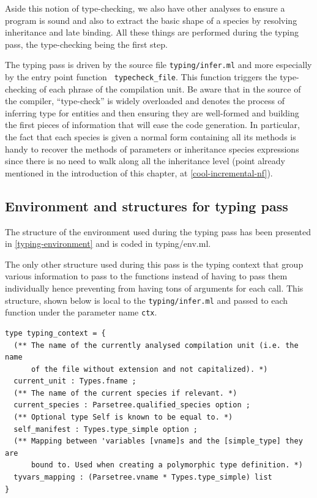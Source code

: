 \medskip
Aside this notion of type-checking, we also have other analyses to
ensure a program is sound and also to extract the basic shape of a
species by resolving inheritance and late binding. All these things
are performed during the typing pass, the type-checking being the
first step.

\medskip
The typing pass is driven by the source file {\tt typing/infer.ml} and
more especially by the entry point function {\tt
  typecheck\_file}. This function triggers the type-checking of each
phrase of the compilation unit. Be aware that in the source of the
compiler, ``type-check'' is widely overloaded and denotes the process
of inferring type for entities and then ensuring they are well-formed
and building the first pieces of information that will ease the code
generation. In particular, the fact that each species is given a
normal form containing all its methods is handy to recover the methods
of parameters or inheritance species expressions since there is no
need to walk along all the inheritance level (point already mentioned
in the introduction of this chapter, at \ref{cool-incremental-nf}).



\subsection{Environment and structures for typing pass}
The structure of the environment used during the typing pass has been
presented in \ref{typing-environment} and is coded in {typing/env.ml}.

The only other structure used during this pass is the typing context
that group various information to pass to the functions instead of
having to pass them individually hence preventing from having tons of
arguments for each call. This structure, shown below is local to
the {\tt typing/infer.ml} and passed to each function under the
parameter name {\tt ctx}.

{\footnotesize
\begin{lstlisting}[language=MyOCaml, title=Typing context]
type typing_context = {
  (** The name of the currently analysed compilation unit (i.e. the name
      of the file without extension and not capitalized). *)
  current_unit : Types.fname ;
  (** The name of the current species if relevant. *)
  current_species : Parsetree.qualified_species option ;
  (** Optional type Self is known to be equal to. *)
  self_manifest : Types.type_simple option ;
  (** Mapping between 'variables [vname]s and the [simple_type] they are
      bound to. Used when creating a polymorphic type definition. *)
  tyvars_mapping : (Parsetree.vname * Types.type_simple) list
}
\end{lstlisting}
}




